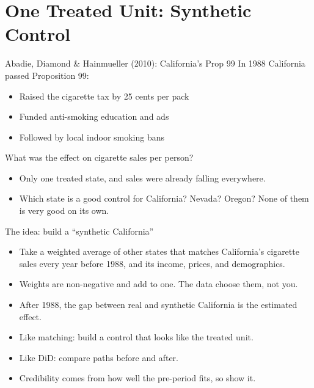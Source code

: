 \documentclass[aspectratio=169,11pt]{beamer}
\begin{document}
\section{One Treated Unit: Synthetic Control}

\begin{frame}{Abadie, Diamond \& Hainmueller (2010): California's Prop 99}
In 1988 California passed Proposition 99:
\begin{itemize}
	\item Raised the cigarette tax by 25 cents per pack
	\item Funded anti-smoking education and ads
	\item Followed by local indoor smoking bans
\end{itemize}
What was the effect on cigarette sales per person?
\begin{itemize}
	\item Only \alert{one} treated state, and sales were already falling everywhere.
	\item Which state is a good control for California? Nevada? Oregon? None of them is very good on its own.
\end{itemize}
\end{frame}


\begin{frame}{The idea: build a ``synthetic California''}
\begin{itemize}
	\item Take a \alert{weighted average of other states} that matches California's cigarette sales \alert{every year before 1988}, and its income, prices, and demographics.
	\item Weights are non-negative and add to one. The data choose them, not you.
	\item After 1988, the gap between real and synthetic California is the estimated effect.
\end{itemize}
\medskip
\begin{itemize}
	\item Like \alert{matching}: build a control that looks like the treated unit.
	\item Like \alert{DiD}: compare paths before and after.
	\item Credibility comes from \alert{how well the pre-period fits}, so show it.
\end{itemize}
\end{frame}
\end{document}
